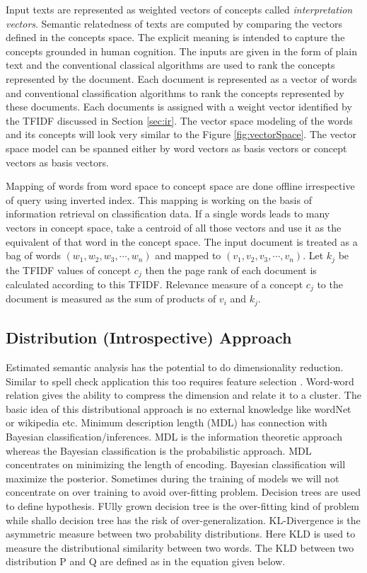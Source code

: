 \documentclass{bmcart}
\begin{document}
Input texts are represented as weighted vectors of concepts called {\it interpretation vectors}. 
Semantic relatedness of texts are computed by comparing the vectors defined in the concepts space. The explicit meaning is intended to capture the concepts grounded in human cognition. The inputs are given in the form of plain text and the conventional classical algorithms are used to rank the concepts represented by the document. Each document is represented as a vector of words and conventional classification algorithms to rank the concepts represented by these documents. Each documents is assigned with a weight vector identified by the TFIDF discussed in Section \ref{sec:ir}. The vector space modeling of the words and its concepts will look very similar to the Figure \ref{fig:vectorSpace}.  The vector space model can be spanned either by word vectors as basis vectors or concept vectors as basis vectors.

Mapping of words from word space to concept space are done offline irrespective of query using inverted index. This mapping is working on the basis of information retrieval on classification data. If a single words leads to many vectors in concept space, take a centroid of all those vectors and use it as the equivalent of that word in the concept space. The input document is treated as a bag of words $( w_1, w_2, w_3, \cdots, w_n)$ and mapped to $( v_1, v_2 , v_3, \cdots , v_n)$. Let $k_j$ be the TFIDF values of concept $c_j$ then the page rank of each document is calculated according to this TFIDF. Relevance measure of a concept $c_j$ to the document is measured as the sum of products of $v_i$ and $k_j$. 

\subsection{Distribution (Introspective) Approach}
\label{ssec:introspectiveApproach}

Estimated semantic analysis has the potential to do dimensionality reduction. Similar to spell check application this too requires feature selection \cite{featureSelection}. Word-word relation gives the ability to compress the dimension and relate it to a cluster. The basic idea of this distributional approach is no external knowledge like wordNet or wikipedia etc. Minimum description length (MDL) has connection  with Bayesian classification/inferences. MDL is the information theoretic approach whereas the Bayesian classification is the probabilistic approach. MDL concentrates on minimizing the length of encoding. Bayesian classification will maximize the posterior. Sometimes during the training of models we will not concentrate on over training to avoid over-fitting problem. Decision trees are used to define hypothesis. FUlly grown decision tree is the over-fitting kind of problem while shallo decision tree has the risk of over-generalization. KL-Divergence is the asymmetric measure between two probability distributions. Here KLD is used to measure the  distributional similarity between two words. The KLD between two distribution P and Q are defined as in the equation given below.
\end{document}
